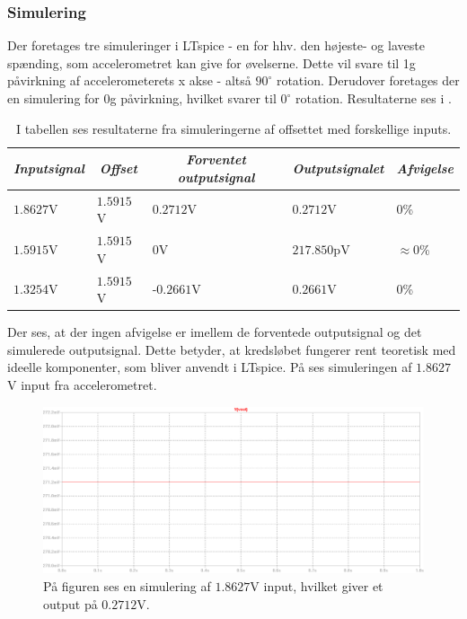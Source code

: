 \subsubsection{Simulering}
Der foretages tre simuleringer i LTspice - en for hhv. den højeste- og laveste spænding, som accelerometret kan give for øvelserne. Dette vil svare til 1g påvirkning af accelerometerets x akse - altså $90^{\circ}$ rotation. Derudover foretages der en simulering for 0g påvirkning, hvilket svarer til $0^{\circ}$ rotation. Resultaterne ses i .
\begin{table}[H]
	\centering
	\begin{tabular}{|l|l|l|l|l|}
		\hline
		\multicolumn{1}{|c|}{\textit{Inputsignal}} & \multicolumn{1}{c|}{\textit{Offset}} & \multicolumn{1}{c|}{\textit{Forventet outputsignal}} & \multicolumn{1}{c|}{\textit{Outputsignalet}} & \multicolumn{1}{c|}{\textit{Afvigelse}} \\ \hline
		$1.8627$V     & $1.5915$V    & $0.2712$V     & $0.2712$V     & $0$\%              \\ \hline
		$1.5915$V     & $1.5915$V    & $0$V          & $217.850$pV   & $\approx 0$\%      \\ \hline
		$1.3254$V     & $1.5915$V    & -$0.2661$V    & $0.2661$V      & $0$\%                \\ \hline
	\end{tabular}
	\caption{I tabellen ses resultaterne fra simuleringerne af offsettet med forskellige inputs.}
	\label{Tab:offset_sim}
\end{table}
\noindent Der ses, at der ingen afvigelse er imellem de forventede outputsignal og det simulerede outputsignal. Dette betyder, at kredsløbet fungerer rent teoretisk med ideelle komponenter, som bliver anvendt i LTspice. På  ses simuleringen af $1.8627$V input fra accelerometret.
 
\begin{figure}[H]
\centering
\includegraphics[scale=0.4]{figures/cProblemloesning/Offset_simulering.png}
\caption{På figuren ses en simulering af $1.8627$V input, hvilket giver et output på $0.2712$V.}
\label{fig:Offset_simulering}
\end{figure}

